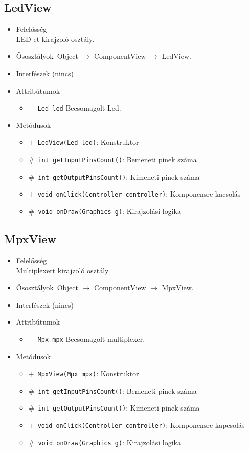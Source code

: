 \subsection{LedView}
\begin{itemize}
\item Felelősség\\
LED-et kirajzoló osztály.
\item Ősosztályok\ Object $\rightarrow{}$ ComponentView $\rightarrow{}$ LedView.
\item Interfészek (nincs)
\item Attribútumok $\ $
\begin{itemize}
	\item[] \texttt{$-$ Led led} Becsomagolt Led.
\end{itemize}
\item Metódusok$\ $
\begin{itemize}
	\item[] \texttt{$+$ LedView(Led led)}: Konstruktor
	\item[] \texttt{$\#$ int getInputPinsCount()}: Bemeneti pinek száma
	\item[] \texttt{$\#$ int getOutputPinsCount()}: Kimeneti pinek száma
	\item[] \texttt{$+$ void onClick(Controller controller)}: Komponensre kacsolás
	\item[] \texttt{$\#$ void onDraw(Graphics g)}: Kirajzolási logika
\end{itemize}
\end{itemize}

\subsection{MpxView}
\begin{itemize}
\item Felelősség\\
Multiplexert kirajzoló osztály
\item Ősosztályok\ Object $\rightarrow{}$ ComponentView $\rightarrow{}$ MpxView.
\item Interfészek (nincs)
\item Attribútumok $\ $
\begin{itemize}
	\item[] \texttt{$-$ Mpx mpx} Becsomagolt multiplexer.
\end{itemize}
\item Metódusok$\ $
\begin{itemize}
	\item[] \texttt{$+$ MpxView(Mpx mpx)}: Konstruktor
	\item[] \texttt{$\#$ int getInputPinsCount()}: Bemeneti pinek száma
	\item[] \texttt{$\#$ int getOutputPinsCount()}: Kimeneti pinek száma
	\item[] \texttt{$+$ void onClick(Controller controller)}: Komponensre kapcsolás
	\item[] \texttt{$\#$ void onDraw(Graphics g)}: Kirajzolási logika
\end{itemize}
\end{itemize}

